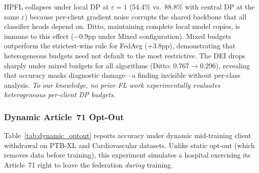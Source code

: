 \documentclass[conference]{IEEEtran}
\begin{document}
\begin{table}[htbp]
\centering
\caption{Cross-border heterogeneous DP on PTB-XL (5 clients, 5-class ECG). Per-client local DP with Gaussian mechanism, $C{=}1.0$, $\delta{=}10^{-5}$. Mean $\pm$ std over 3 seeds.}
\label{tab:crossborder_dp}

\vspace{1mm}
\footnotesize{HPFL collapses under local DP at $\varepsilon{=}1$ (54.4\% vs.\ 88.8\% with central DP at the same $\varepsilon$) because per-client gradient noise corrupts the shared backbone that all classifier heads depend on. Ditto, maintaining complete local model copies, is immune to this effect ($-$0.9pp under Mixed configuration). Mixed budgets outperform the strictest-wins rule for FedAvg (+3.8pp), demonstrating that heterogeneous budgets need not default to the most restrictive. The DEI drops sharply under mixed budgets for all algorithms (Ditto: 0.767$\to$0.296), revealing that accuracy masks diagnostic damage---a finding invisible without per-class analysis. \textit{To our knowledge, no prior FL work experimentally evaluates heterogeneous per-client DP budgets.}}
\end{table}

\subsubsection{Dynamic Article~71 Opt-Out}
\label{sec:dynamic_optout}

Table~\ref{tab:dynamic_optout} reports accuracy under dynamic mid-training client withdrawal on PTB-XL and Cardiovascular datasets. Unlike static opt-out (which removes data before training), this experiment simulates a hospital exercising its Article~71 right to leave the federation \textit{during} training.
\end{document}
